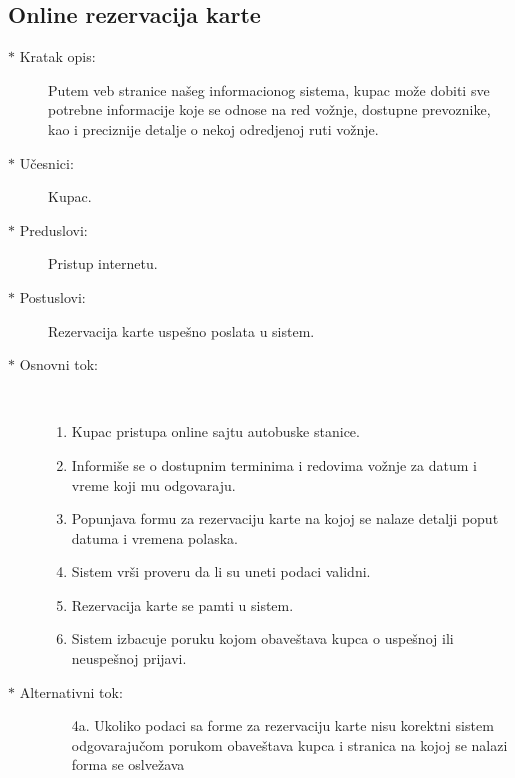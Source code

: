 \subsection{Online rezervacija karte}
\begin{description}
	\item [$\ast$ Kratak opis: ] Putem veb stranice na\v seg informacionog sistema, kupac mo\v ze dobiti sve potrebne informacije koje se odnose na red vo\v znje, dostupne prevoznike, kao i preciznije detalje o nekoj odredj{}enoj ruti vo\v znje.
	
	\item[$\ast$ U\v cesnici: ] Kupac.
	\item[$\ast$ Preduslovi: ] Pristup internetu.
	\item[$\ast$ Postuslovi: ] Rezervacija karte uspe\v sno poslata u sistem.
	\item[$\ast$ Osnovni tok: ] \ \\
	\renewcommand{\labelenumii}{\Roman{enumii}}
	\begin{enumerate}
		\item Kupac pristupa online sajtu autobuske stanice.
		\item Informi\v se se o dostupnim terminima i redovima vo\v znje za datum i vreme koji mu odgovaraju.
		\item Popunjava formu za rezervaciju karte na kojoj se nalaze detalji poput datuma i vremena polaska.
		\item Sistem vr\v si proveru da li su uneti podaci validni.
		\item Rezervacija karte se pamti u sistem.
		\item Sistem izbacuje poruku kojom obave\v stava kupca o uspe\v snoj ili neuspe\v snoj prijavi.
	\end{enumerate}
	\item[$\ast$ Alternativni tok: ]
	\begin{enumerate}
		\item[4a. ] Ukoliko podaci sa forme za rezervaciju karte nisu korektni sistem odgovaraju\v com porukom obave\v stava kupca i stranica na kojoj se nalazi forma se oslve\v zava
	\end{enumerate}
	
\end{description}
\newpage
